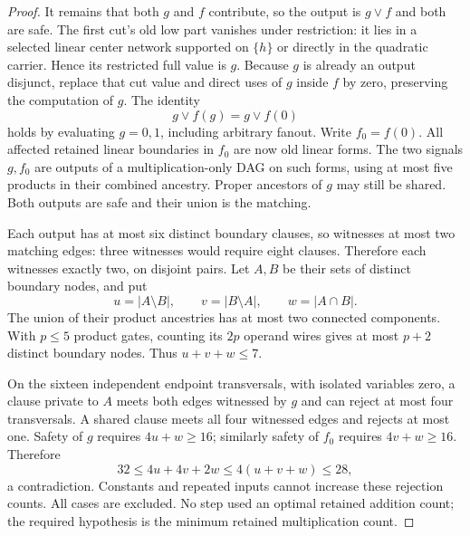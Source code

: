 \documentclass[11pt]{article}
\theoremstyle{definition}
\theoremstyle{remark}
\begin{document}
\begin{proof}
It remains that both $g$ and $f$ contribute, so the output is $g\vee f$ and both are safe. The first cut's old low part vanishes under restriction: it lies in a selected linear center network supported on $\{h\}$ or directly in the quadratic carrier. Hence its restricted full value is $g$. Because $g$ is already an output disjunct, replace that cut value and direct uses of $g$ inside $f$ by zero, preserving the computation of $g$. The identity
\[
 g\vee f(g)=g\vee f(0)
\]
holds by evaluating $g=0,1$, including arbitrary fanout. Write $f_0=f(0)$. All affected retained linear boundaries in $f_0$ are now old linear forms. The two signals $g,f_0$ are outputs of a multiplication-only DAG on such forms, using at most five products in their combined ancestry. Proper ancestors of $g$ may still be shared. Both outputs are safe and their union is the matching.

Each output has at most six distinct boundary clauses, so witnesses at most two matching edges: three witnesses would require eight clauses. Therefore each witnesses exactly two, on disjoint pairs. Let $A,B$ be their sets of distinct boundary nodes, and put
\[
 u=|A\setminus B|,\qquad v=|B\setminus A|,\qquad w=|A\cap B|.
\]
The union of their product ancestries has at most two connected components. With $p\le5$ product gates, counting its $2p$ operand wires gives at most $p+2$ distinct boundary nodes. Thus $u+v+w\le7$.

On the sixteen independent endpoint transversals, with isolated variables zero, a clause private to $A$ meets both edges witnessed by $g$ and can reject at most four transversals. A shared clause meets all four witnessed edges and rejects at most one. Safety of $g$ requires $4u+w\ge16$; similarly safety of $f_0$ requires $4v+w\ge16$. Therefore
\[
 32\le4u+4v+2w\le4(u+v+w)\le28,
\]
a contradiction. Constants and repeated inputs cannot increase these rejection counts. All cases are excluded. No step used an optimal retained addition count; the required hypothesis is the minimum retained multiplication count.
\end{proof}
\end{document}
